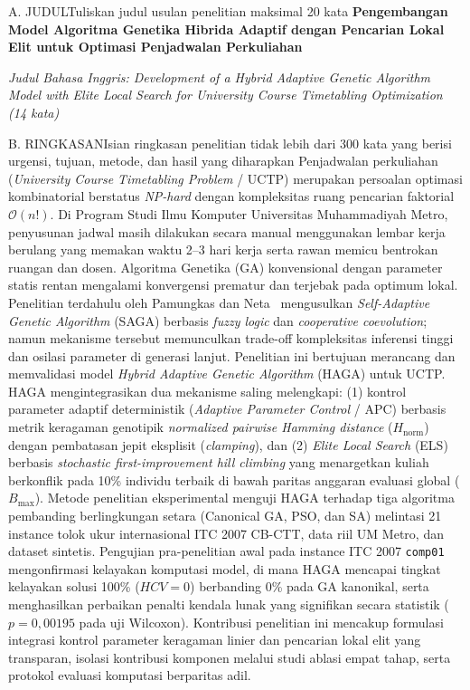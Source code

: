 \documentclass[letterpaper,12pt,oneside]{article}
\begin{document}
\setcounter{page}{1}

\noindent\begin{wordsection}{A. JUDUL}{Tuliskan judul usulan penelitian maksimal 20 kata}
\textbf{Pengembangan Model Algoritma Genetika Hibrida Adaptif dengan Pencarian Lokal Elit untuk Optimasi Penjadwalan Perkuliahan}

\vspace{0.3em}
\noindent\textit{Judul Bahasa Inggris: Development of a Hybrid Adaptive Genetic Algorithm Model with Elite Local Search for University Course Timetabling Optimization (14 kata)}
\end{wordsection}%
\vspace{-1.2pt}%
\noindent\begin{wordsection}{B. RINGKASAN}{Isian ringkasan penelitian tidak lebih dari 300 kata yang berisi urgensi, tujuan, metode, dan hasil yang diharapkan}
Penjadwalan perkuliahan (\textit{University Course Timetabling Problem} / UCTP) merupakan persoalan optimasi kombinatorial berstatus \textit{NP-hard} dengan kompleksitas ruang pencarian faktorial $\mathcal{O}(n!)$. Di Program Studi Ilmu Komputer Universitas Muhammadiyah Metro, penyusunan jadwal masih dilakukan secara manual menggunakan lembar kerja berulang yang memakan waktu 2--3 hari kerja serta rawan memicu bentrokan ruangan dan dosen. Algoritma Genetika (GA) konvensional dengan parameter statis rentan mengalami konvergensi prematur dan terjebak pada optimum lokal. Penelitian terdahulu oleh Pamungkas dan Neta~\cite{pamungkas2025saga} mengusulkan \textit{Self-Adaptive Genetic Algorithm} (SAGA) berbasis \textit{fuzzy logic} dan \textit{cooperative coevolution}; namun mekanisme tersebut memunculkan trade-off kompleksitas inferensi tinggi dan osilasi parameter di generasi lanjut. Penelitian ini bertujuan merancang dan memvalidasi model \textit{Hybrid Adaptive Genetic Algorithm} (HAGA) untuk UCTP. HAGA mengintegrasikan dua mekanisme saling melengkapi: (1) kontrol parameter adaptif deterministik (\textit{Adaptive Parameter Control} / APC) berbasis metrik keragaman genotipik \textit{normalized pairwise Hamming distance} ($H_{\text{norm}}$) dengan pembatasan jepit eksplisit (\textit{clamping}), dan (2) \textit{Elite Local Search} (ELS) berbasis \textit{stochastic first-improvement hill climbing} yang menargetkan kuliah berkonflik pada 10\% individu terbaik di bawah paritas anggaran evaluasi global ($B_{\max}$). Metode penelitian eksperimental menguji HAGA terhadap tiga algoritma pembanding berlingkungan setara (Canonical GA, PSO, dan SA) melintasi 21 instance tolok ukur internasional ITC 2007 CB-CTT, data riil UM Metro, dan dataset sintetis. Pengujian pra-penelitian awal pada instance ITC 2007 \texttt{comp01} mengonfirmasi kelayakan komputasi model, di mana HAGA mencapai tingkat kelayakan solusi 100\% ($HCV=0$) berbanding 0\% pada GA kanonikal, serta menghasilkan perbaikan penalti kendala lunak yang signifikan secara statistik ($p = 0{,}00195$ pada uji Wilcoxon). Kontribusi penelitian ini mencakup formulasi integrasi kontrol parameter keragaman linier dan pencarian lokal elit yang transparan, isolasi kontribusi komponen melalui studi ablasi empat tahap, serta protokol evaluasi komputasi berparitas adil.

\end{wordsection}
\end{document}
